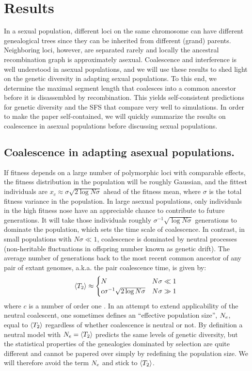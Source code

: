 \section{Results}
In a sexual population, different loci on the same chromosome can have
different genealogical trees since they can be inherited from different
(grand) parents. Neighboring loci, however, are separated rarely and
locally the ancestral recombination graph is approximately asexual.
Coalescence and interference is well understood in asexual populations,
and we will use these results to shed light on the genetic diversity in
adapting sexual populations. To this end, we determine the maximal
segment length that coalesces into a common ancestor before it is
disassembled by recombination. This yields self-consistent predictions
for genetic diversity and the SFS that compare very well to
simulations. In order to make the paper self-contained, we will quickly
summarize the results on coalescence in asexual populations before
discussing sexual populations.

\subsection*{Coalescence in adapting asexual populations.}
If fitness depends on a large number of polymorphic loci
with comparable effects, the fitness distribution in the population will
be roughly Gaussian, and the fittest individuals are $x_c \approx \sigma
\sqrt{2\log N\sigma}$ ahead of the fitness mean, where $\sigma$ is the
total fitness variance in the
population\cite{Tsimring:1996p19688,Rouzine:2003p33590,Desai:2007p954}. 
In large asexual populations, only individuals in the high
fitness nose have an appreciable chance to contribute to future generations.  
It will take those individuals roughly $\sigma^{-1}\sqrt{\log N\sigma}$
generations to dominate the population, which sets the time scale of
coalescence.  In contrast, in small populations with $N\sigma \ll 1$,
coalescence is dominated by neutral processes (non-heritable
fluctuations in offspring number known as genetic drift). The average 
number of generations back to the most recent common ancestor of any
pair of extant genomes, a.k.a. the pair coalescence time, is given by:
\begin{equation}
  \label{eq:asex}
  \mTtwo \approx
  \begin{cases}
    N & N\sigma \ll 1 \\
    c\sigma^{-1}\sqrt{2\log N\sigma} & N\sigma\gg 1
  \end{cases}
\end{equation}
where $c$ is a number of order one
\cite{neher_genealogies_2012,desai_genetic_2012}. In an attempt to
extend applicability of the neutral coalescent, one sometimes defines an
``effective population size'', $N_e$, equal to $\langle T_2\rangle$ regardless of whether
coalescence is neutral or not. By definition a neutral model with
$N_e=\langle T_2\rangle$ predicts the same levels of genetic diversity, but the
statistical properties of the genealogies dominated by selection are quite
different and cannot be papered over simply by redefining the population
size. We will therefore avoid the term $N_e$ and stick to $\langle T_2\rangle$. 

